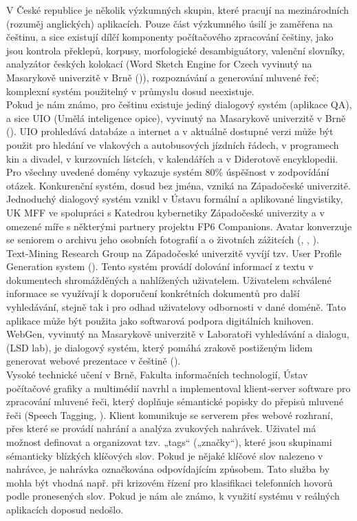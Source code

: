 \documentclass[]{../../metanetpaper}
\begin{document}
\begin{multicols}{2}
V České republice je několik výzkumných skupin, které pracují na mezinárodních (rozuměj anglických) aplikacích. Pouze část výzkumného úsilí je zaměřena na češtinu, a sice existují dílčí komponenty počítačového zpracování češtiny, jako jsou kontrola překlepů, korpusy, morfologické desambiguátory, valenční slovníky, analyzátor českých kolokací (Word Sketch Engine for Czech vyvinutý na Masarykově univerzitě v Brně (\cite{Horak2009})), rozpoznávání a generování mluvené řeč; komplexní systém použitelný v průmyslu dosud neexistuje.\\
Pokud je nám známo, pro češtinu existuje jediný dialogový systém (aplikace QA), a sice UIO (Umělá inteligence opice), vyvinutý na Masarykově univerzitě v Brně (\cite{Svoboda2003}). UIO prohledává databáze a internet a v aktuálně dostupné verzi může být použit pro hledání ve vlakových a autobusových jízdních řádech, v programech kin a divadel, v kurzovních lístcích, v kalendářích a v Diderotově encyklopedii. Pro všechny uvedené domény vykazuje systém 80\% úspěšnost v zodpovídání otázek. Konkurenční systém, dosud bez jména, vzniká na Západočeské univerzitě.\\
Jednoduchý dialogový systém vznikl v Ústavu formální a aplikované lingvistiky, UK MFF ve spolupráci s Katedrou kybernetiky Západočeské univerzity a v omezené míře s některými partnery projektu FP6 Companions\cite{Note21}. Avatar konverzuje se seniorem o archivu jeho osobních fotografií a o životních zážitcích (\cite{Ptacek2010}, \cite{Romportl2010}, \cite{GruberTihelka2010}).\\
Text-Mining Research Group na Západočeské univerzitě vyvíjí tzv. User Profile Generation system (\cite{Grolmus2003}). Tento systém provádí dolování informací z textu v dokumentech shromážděných a nahlížených uživatelem. Uživatelem schválené informace se využívají k doporučení konkrétních dokumentů pro další vyhledávání, stejně tak i pro odhad uživatelovy odbornosti v dané doméně. Tato aplikace může být použita jako softwarová podpora digitálních knihoven.\\
WebGen, vyvinutý na Masarykově univerzitě v Laboratoři vyhledávání a dialogu, (LSD lab\cite{Note22}), je dialogový systém, který pomáhá zrakově postiženým lidem generovat webové prezentace v češtině (\cite{BartelPlhak2008}).\\
Vysoké technické učení v Brně, Fakulta informačních technologií, Ústav počítačové grafiky a multimédií navrhl a implementoval klient-server software pro zpracování mluvené řeči\cite{Note23}, který doplňuje sémantické popisky do přepisů mluvené řeči (Speech Tagging, \cite{Smrz2010}). Klient komunikuje se serverem přes webové rozhraní, přes které se provádí nahrání a analýza zvukových nahrávek. Uživatel má možnost definovat a organizovat tzv. „tags“ („značky“), které jsou skupinami sémanticky blízkých klíčových slov. Pokud je nějaké klíčové slov nalezeno v nahrávce, je nahrávka označkována odpovídajícím způsobem. Tato služba by mohla být vhodná např. při krizovém řízení pro klasifikaci telefonních hovorů podle pronesených slov. Pokud je nám ale známo, k využití systému v reálných aplikacích doposud nedošlo.\\

\end{multicols}
\end{document}
